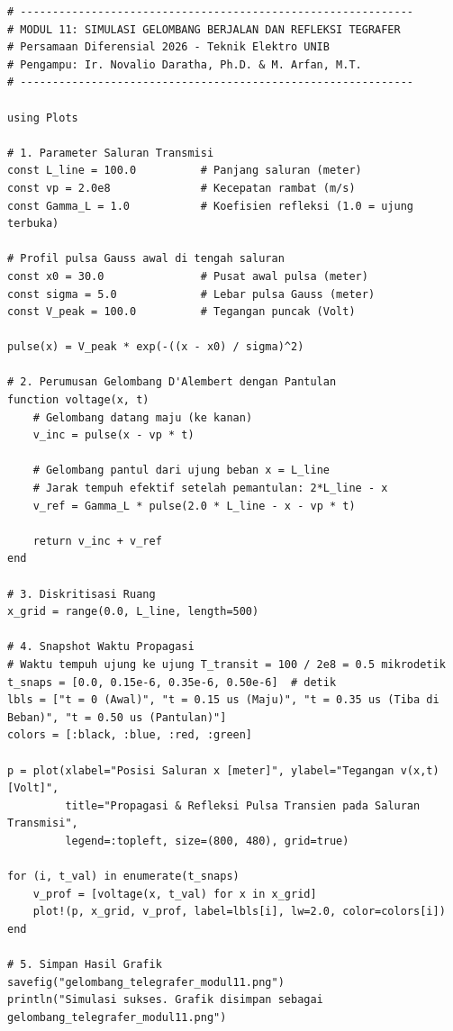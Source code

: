 \documentclass[11pt,a4paper]{article}
\theoremstyle{definition}
\begin{document}
\begin{lstlisting}[style=juliastyle, caption={Skrip Julia perambatan gelombang berjalan d'Alembert dan refleksi batas.}, label={lst:julia_wave_reflection}]
# -------------------------------------------------------------
# MODUL 11: SIMULASI GELOMBANG BERJALAN DAN REFLEKSI TEGRAFER
# Persamaan Diferensial 2026 - Teknik Elektro UNIB
# Pengampu: Ir. Novalio Daratha, Ph.D. & M. Arfan, M.T.
# -------------------------------------------------------------

using Plots

# 1. Parameter Saluran Transmisi
const L_line = 100.0          # Panjang saluran (meter)
const vp = 2.0e8              # Kecepatan rambat (m/s)
const Gamma_L = 1.0           # Koefisien refleksi (1.0 = ujung terbuka)

# Profil pulsa Gauss awal di tengah saluran
const x0 = 30.0               # Pusat awal pulsa (meter)
const sigma = 5.0             # Lebar pulsa Gauss (meter)
const V_peak = 100.0          # Tegangan puncak (Volt)

pulse(x) = V_peak * exp(-((x - x0) / sigma)^2)

# 2. Perumusan Gelombang D'Alembert dengan Pantulan
function voltage(x, t)
    # Gelombang datang maju (ke kanan)
    v_inc = pulse(x - vp * t)
    
    # Gelombang pantul dari ujung beban x = L_line
    # Jarak tempuh efektif setelah pemantulan: 2*L_line - x
    v_ref = Gamma_L * pulse(2.0 * L_line - x - vp * t)
    
    return v_inc + v_ref
end

# 3. Diskritisasi Ruang
x_grid = range(0.0, L_line, length=500)

# 4. Snapshot Waktu Propagasi
# Waktu tempuh ujung ke ujung T_transit = 100 / 2e8 = 0.5 mikrodetik
t_snaps = [0.0, 0.15e-6, 0.35e-6, 0.50e-6]  # detik
lbls = ["t = 0 (Awal)", "t = 0.15 us (Maju)", "t = 0.35 us (Tiba di Beban)", "t = 0.50 us (Pantulan)"]
colors = [:black, :blue, :red, :green]

p = plot(xlabel="Posisi Saluran x [meter]", ylabel="Tegangan v(x,t) [Volt]",
         title="Propagasi & Refleksi Pulsa Transien pada Saluran Transmisi",
         legend=:topleft, size=(800, 480), grid=true)

for (i, t_val) in enumerate(t_snaps)
    v_prof = [voltage(x, t_val) for x in x_grid]
    plot!(p, x_grid, v_prof, label=lbls[i], lw=2.0, color=colors[i])
end

# 5. Simpan Hasil Grafik
savefig("gelombang_telegrafer_modul11.png")
println("Simulasi sukses. Grafik disimpan sebagai gelombang_telegrafer_modul11.png")
\end{lstlisting}
\end{document}
